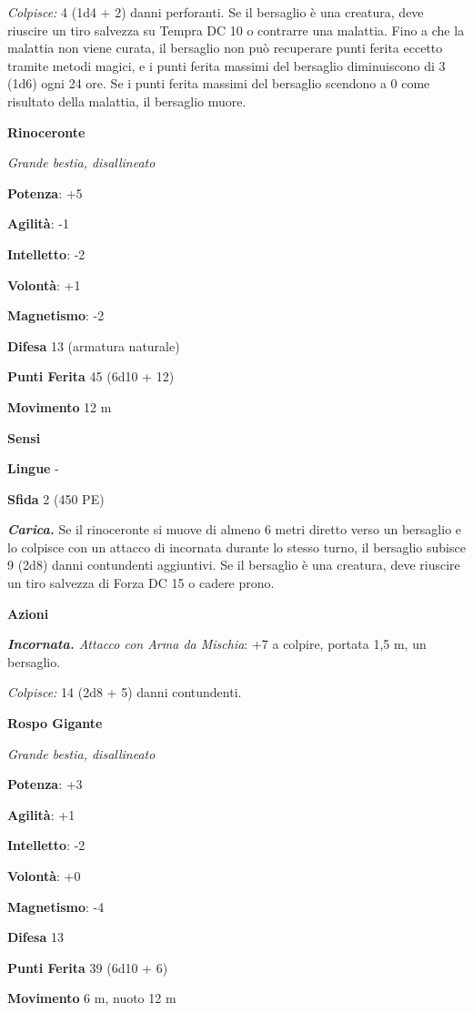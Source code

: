 \begin{multicols}{2}
\emph{Colpisce:} 4 (1d4 + 2) danni perforanti. Se il bersaglio è una
creatura, deve riuscire un tiro salvezza su Tempra DC 10 o
contrarre una malattia. Fino a che la malattia non viene curata, il
bersaglio non può recuperare punti ferita eccetto tramite metodi magici,
e i punti ferita massimi del bersaglio diminuiscono di 3 (1d6) ogni 24
ore. Se i punti ferita massimi del bersaglio scendono a 0 come risultato
della malattia, il bersaglio muore.

\textbf{Rinoceronte}

\emph{Grande bestia, disallineato}

\textbf{Potenza}: +5

\textbf{Agilità}: -1

\textbf{Intelletto}: -2

\textbf{Volontà}: +1

\textbf{Magnetismo}: -2

\textbf{Difesa} 13 (armatura naturale)

\textbf{Punti Ferita} 45 (6d10 + 12)

\textbf{Movimento} 12 m

\textbf{Sensi} 

\textbf{Lingue} -

\textbf{Sfida} 2 (450 PE)

\emph{\textbf{Carica.}} Se il rinoceronte si muove di almeno 6 metri
diretto verso un bersaglio e lo colpisce con un attacco di incornata
durante lo stesso turno, il bersaglio subisce 9 (2d8) danni contundenti
aggiuntivi. Se il bersaglio è una creatura, deve riuscire un tiro
salvezza di Forza DC 15 o cadere prono.

\textbf{Azioni}

\emph{\textbf{Incornata.} Attacco con Arma da Mischia}: +7 a colpire,
portata 1,5 m, un bersaglio.

\emph{Colpisce:} 14 (2d8 + 5) danni contundenti.

\textbf{Rospo Gigante}

\emph{Grande bestia, disallineato}

\textbf{Potenza}: +3

\textbf{Agilità}: +1

\textbf{Intelletto}: -2

\textbf{Volontà}: +0

\textbf{Magnetismo}: -4

\textbf{Difesa} 13

\textbf{Punti Ferita} 39 (6d10 + 6)

\textbf{Movimento} 6 m, nuoto 12 m


\end{multicols}
